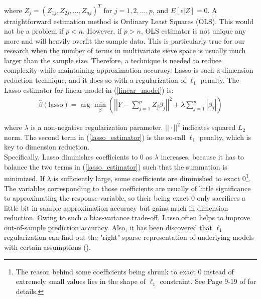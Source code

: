 \documentclass[12pt, a4paper]{article}
\theoremstyle{MAstyle} \newtheorem{assumption}{Assumption}[section]
\theoremstyle{MAstyle} \newtheorem{definition}{Definition}[section]
\theoremstyle{MAstyle} \newtheorem{theorem}{Theorem}[section]
\theoremstyle{MAstyle} \newtheorem{corollary}{Corollary}[section]
\begin{document}
        where $Z_j=(Z_{1j}, Z_{2j}, \ldots, Z_{nj})^{T}$ for $j=1,2,\ldots,p$, and $E[\epsilon|Z]=0$. A straightforward estimation method is Ordinary Least Squares (OLS). This would not be a problem if $p<n$. However, if $p>n$, OLS estimator is not unique any more and will heavily overfit the sample data. This is particularly true for our research when the number of terms in multivariate sieve space is usually much larger than the sample size. Therefore, a technique is needed to reduce complexity while maintaining approximation accuracy. Lasso is such a dimension reduction technique, and it does so with a regularization of $\ell_1$ penalty. The Lasso estimator for linear model in (\ref{linear_model}) is:
        \begin{align}\label{lasso_estimator}
            \hat{\beta}(\mathrm{lasso})=\arg\min\limits_{\beta} \left(\left|\left|Y-\sum\limits_{j=1}^p Z_j\beta_j\right|\right|^2+\lambda\sum\limits_{j=1}^p\left|\beta_j\right| \right)
        \end{align}

        where $\lambda$ is a non-negative regularization parameter. $||\cdot||^2$ indicates squared $L_2$ norm. The second term in (\ref{lasso_estimator}) is the so-call $\ell_1$ penalty, which is key to dimension reduction.\\
        
        Specifically, Lasso diminishes coefficients to 0 as $\lambda$ increases, because it has to balance the two terms in (\ref{lasso_estimator}) such that the summation is minimized. If $\lambda$ is sufficiently large, some coefficients are diminished to exact 0\footnote{The reason behind some coefficients being shrunk to exact 0 instead of extremely small values lies in the shape of $\ell_1$ constraint. See Page 9-19 of \cite{Bühlmann_van_de_Geer_2011} for details.}. The variables corresponding to those coefficients are usually of little significance to approximating the response variable, so their being exact 0 only sacrifices a little bit in-sample approximation accuracy but gains much in dimension reduction. Owing to such a bias-variance trade-off, Lasso often helps to improve out-of-sample prediction accuracy. Also, it has been discovered that $\ell_1$ regularization can find out the "right" sparse representation of underlying models with certain assumptions (\cite{Donoho_Elad_2003}). \\
\end{document}
